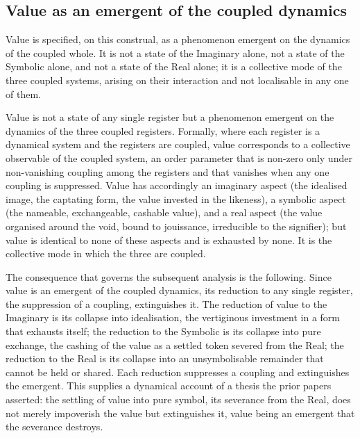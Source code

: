 \subsection{Value as an emergent of the coupled dynamics}
\label{p10:sec:emergence}

Value is specified, on this construal, as a phenomenon emergent on the dynamics of the coupled whole. It is not a state of the Imaginary alone, not a state of the Symbolic alone, and not a state of the Real alone; it is a collective mode of the three coupled systems, arising on their interaction and not localisable in any one of them.

\begin{claim}
Value is not a state of any single register but a phenomenon emergent on the dynamics of the three coupled registers. Formally, where each register is a dynamical system and the registers are coupled, value corresponds to a collective observable of the coupled system, an order parameter that is non-zero only under non-vanishing coupling among the registers and that vanishes when any one coupling is suppressed. Value has accordingly an imaginary aspect (the idealised image, the captating form, the value invested in the likeness), a symbolic aspect (the nameable, exchangeable, cashable value), and a real aspect (the value organised around the void, bound to jouissance, irreducible to the signifier); but value is identical to none of these aspects and is exhausted by none. It is the collective mode in which the three are coupled.
\end{claim}

\noindent
The consequence that governs the subsequent analysis is the following. Since value is an emergent of the coupled dynamics, its reduction to any single register, the suppression of a coupling, extinguishes it. The reduction of value to the Imaginary is its collapse into idealisation, the vertiginous investment in a form that exhausts itself; the reduction to the Symbolic is its collapse into pure exchange, the cashing of the value as a settled token severed from the Real; the reduction to the Real is its collapse into an unsymbolisable remainder that cannot be held or shared. Each reduction suppresses a coupling and extinguishes the emergent. This supplies a dynamical account of a thesis the prior papers asserted: the settling of value into pure symbol, its severance from the Real, does not merely impoverish the value but extinguishes it, value being an emergent that the severance destroys.

